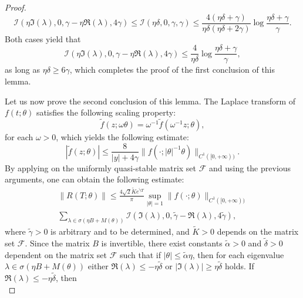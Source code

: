 \documentclass{article}
\theoremstyle{plain}%
\theoremstyle{definition}%
\theoremstyle{remark}%
\newcommand{\cF}{\mathcal{F}}
\newcommand{\cI}{\mathcal{I}}
\newcommand{\+}[1]{{\bm{#1}}}
\begin{document}
\begin{proof}
\begin{displaymath}
    \cI(\eta \Im(\lambda), 0, \gamma - \eta \Re(\lambda), 4 \gamma) 
    \le \cI(\eta \delta, 0, \gamma, \gamma) \le 
    \frac{4 (\eta \delta + \gamma)}
    {\eta \delta (\eta \delta + 2 \gamma)} 
    \log \frac{\eta \delta + \gamma}{\gamma}.
  \end{displaymath}
  Both cases yield that 
  \begin{displaymath}
    \cI(\eta \Im(\lambda), 0, \gamma - \eta \Re(\lambda), 4 \gamma) 
    \le \frac{4}{\eta \delta} 
    \log \frac{\eta \delta + \gamma}{\gamma},
  \end{displaymath}
  as long as $\eta \delta \ge 6 \gamma$, which completes 
  the proof of the first conclusion of this lemma.

  Let us now prove the second conclusion of this lemma. 
  The Laplace transform of $f(t; \theta)$ satisfies the following 
  scaling property:
  \begin{displaymath}
    \tilde{f}(z; \omega \theta) = \omega^{-1}
    \tilde{f}(\omega^{-1} z; \theta), 
  \end{displaymath}
  for each $\omega > 0$, which yields the following estimate:
  \begin{displaymath}
    |\tilde{f}(z; \theta)| \le \frac{8}{|y| + 4 \gamma} 
    \|f(\cdot; |\theta|^{-1} \theta)\|_{C^1([0, +\infty))}.
  \end{displaymath}
  By applying  on the uniformly quasi-stable matrix 
  set $\cF$ and using the previous arguments, one can obtain the 
  following estimate: 
  \begin{multline*}
    \|R(T; \theta)\| \le \frac{4 \sqrt{2} \tilde{K} 
    e^{\tilde{\gamma} T}}{\pi}
    \sup_{|\theta| = 1} \|f(\cdot; \theta)\|_{C^1([0, +\infty))} \\
    \sum_{\lambda \in \sigma(\eta B + M(\theta))} 
    \cI(\Im(\lambda), 0, \tilde{\gamma} - \Re(\lambda), 
    4 \tilde{\gamma}),
  \end{multline*}
  where $\tilde{\gamma} > 0$ is arbitrary and to be determined, 
  and $\tilde{K} > 0$ depends on the matrix set $\cF$.
  Since the matrix $B$ is invertible, there exist constants 
  $\tilde{\alpha} > 0$ and $\tilde{\delta} > 0$ dependent on the 
  matrix set $\cF$ such that if $|\theta| \le \tilde{\alpha} \eta$, 
  then for each eigenvalue $\lambda \in \sigma(\eta B + M(\theta))$ 
  either $\Re(\lambda) \le - \eta \tilde{\delta}$ or 
  $|\Im(\lambda)| \ge \eta \tilde{\delta}$ holds.
  If $\Re(\lambda) \le - \eta \tilde{\delta}$, then 
  \begin{displaymath}

\end{displaymath}
\end{proof}
\end{document}
